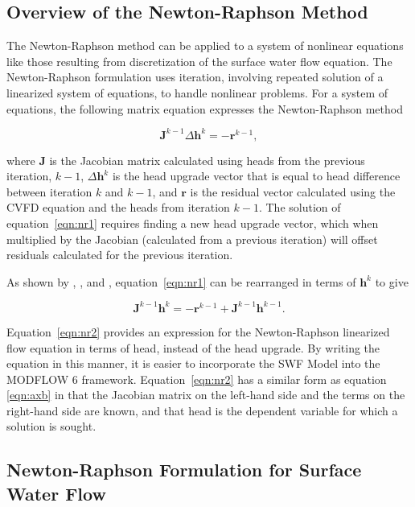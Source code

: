 \documentclass[fleqn]{article}
\newcommand{\matr}[1]{\mathbf{#1}}
\begin{document}
\subsection{Overview of the Newton-Raphson Method}

The Newton-Raphson method can be applied to a system of nonlinear equations like those resulting from discretization of the surface water flow equation.  The Newton-Raphson formulation uses iteration, involving repeated solution of a linearized system of equations, to handle nonlinear problems.  For a system of equations, the following matrix equation expresses the Newton-Raphson method

\begin{equation}
\label{eqn:nr1}
\matr{J}^{k-1} \Delta \matr{h}^{k} = -\matr{r}^{k-1},
\end{equation}
 
\noindent where $\matr{J}$ is the Jacobian matrix calculated using heads from the previous iteration, $k-1$, $\Delta \matr{h}^{k}$ is the head upgrade vector that is equal to head difference between iteration $k$ and $k-1$, and $\matr{r}$ is the residual vector calculated using the CVFD equation and the heads from iteration $k-1$.  The solution of equation~\ref{eqn:nr1} requires finding a new head upgrade vector, which when multiplied by the Jacobian (calculated from a previous iteration) will offset residuals calculated for the previous iteration.

As shown by \cite{modflownwt}, \cite{modflowusg}, and \cite{modflow6gwf}, equation~\ref{eqn:nr1} can be rearranged in terms of $\matr{h}^k$ to give  

\begin{equation}
\label{eqn:nr2}
\matr{J}^{k-1} \matr{h}^{k} = -\matr{r}^{k-1} + \matr{J}^{k-1} \matr{h}^{k-1}.
\end{equation}

\noindent Equation~\ref{eqn:nr2} provides an expression for the Newton-Raphson linearized flow equation in terms of head, instead of the head upgrade.  By writing the equation in this manner, it is easier to incorporate the SWF Model into the MODFLOW 6 framework.  Equation~\ref{eqn:nr2} has a similar form as equation \ref{eqn:axb} in that the Jacobian matrix on the left-hand side and the terms on the right-hand side are known, and that head is the dependent variable for which a solution is sought.


\subsection{Newton-Raphson Formulation for Surface Water Flow}
\end{document}
